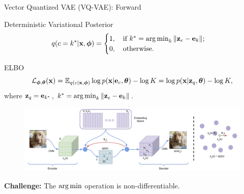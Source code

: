 \documentclass{beamer}
\begin{document}
\begin{frame}{Vector Quantized VAE (VQ-VAE): Forward}
	\begin{block}{Deterministic Variational Posterior}
		\vspace{-0.3cm}
		\[
			q(c = k^* | \mathbf{x}, \boldsymbol{\phi}) = \begin{cases}
			1 , \quad \text{if } k^* = \operatorname*{arg\,min}_k \| \mathbf{z}_e - \mathbf{e}_k \|; \\
			0, \quad \text{otherwise}.
			\end{cases}
		\]
	\vspace{-0.5cm}
	\end{block}	
	\begin{block}{ELBO}
		\vspace{-0.6cm}
		\[
		\mathcal{L}_{\boldsymbol{\phi}, \boldsymbol{\theta}}(\mathbf{x})  = \mathbb{E}_{q(c | \mathbf{x}, \boldsymbol{\phi})} \log p(\mathbf{x} | \mathbf{e}_{c} , \boldsymbol{\theta}) - \log K =  \log p(\mathbf{x} | \mathbf{z}_q, \boldsymbol{\theta}) - \log K,
		\]
		where $\mathbf{z}_q = \mathbf{e}_{k^*}$, $k^* = \operatorname*{arg\,min}_k \| \mathbf{z}_e - \mathbf{e}_k \|$.
	\end{block}
	\vspace{-0.3cm} 
	\begin{figure}
		\centering
		\includegraphics[width=0.85\linewidth]{figs/vqvae}
	\end{figure}
	\vspace{-0.3cm} 
	\textbf{Challenge:} The $\operatorname*{arg\,min}$ operation is non-differentiable.
\end{frame}
\end{document}
